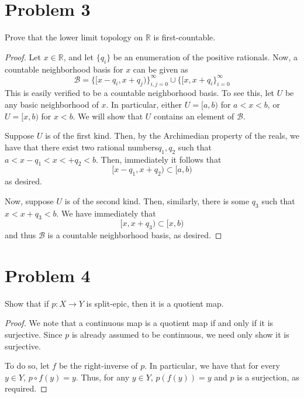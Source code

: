 \documentclass[fontsize=11pt]{scrartcl} %
\numberwithin{equation}{section} %
\numberwithin{figure}{section} %
\numberwithin{table}{section} %
\newcommand{\R}{\mathbb{R}}
\begin{document}
\section*{Problem 3}
Prove that the lower limit topology on $\R$ is first-countable.
\\
\begin{proof}
    Let $x\in\R$, and let $\{q_i\}$ be an enumeration of the positive rationals. 
    Now, a countable neighborhood basis for $x$ can be given as
    \[
        \mathscr{B} = \{[x-q_i, x+q_j)\}_{i,j=0}^{\infty} \cup
        \{[x,x+q_i\}_{i=0}^{\infty}
    \]
    This is easily verified to be a countable neighborhood basis. To see
    this, let $U$ be any basic neighborhood of $x$. In particular, either
    $U = [a,b)$ for $a<x<b$, or $U=[x,b)$ for $x<b$. We will show that $U$
    contains an element of $\mathscr{B}$.

    Suppose $U$ is of the first kind. Then, by the Archimedian property of the
    reals, we have that there exist two rational numbers$q_1,q_2$ such that
    $a<x-q_1<x<+q_2<b$. Then, immediately it follows that
    \[
        [x-q_1,x+q_2)\subset [a,b)
    \]
    as desired.

    Now, suppose $U$ is of the second kind. Then, similarly, there is some $q_3$
    such that $x<x+q_3<b$. We have immediately that
    \[
        [x,x+q_3)\subset [x,b)
    \]
    and thus $\mathscr{B}$ is a countable neighborhood basis, as desired.
\end{proof}
\section*{Problem 4}
Show that if $p:X\to Y$ is split-epic, then it is a quotient map.
\\
\begin{proof}
We note that a continuous map is a quotient map if and only if it is surjective.
    Since $p$ is already assumed to be continuous, we need only show it is
    surjective.

    To do so, let $f$ be the right-inverse of $p$. In particular, we have
    that for every $y\in Y$, $p\circ f(y) = y$. Thus, for any $y\in Y$, $p(f(y))
    = y$ and $p$ is a surjection, as required.
\end{proof}
\end{document}
